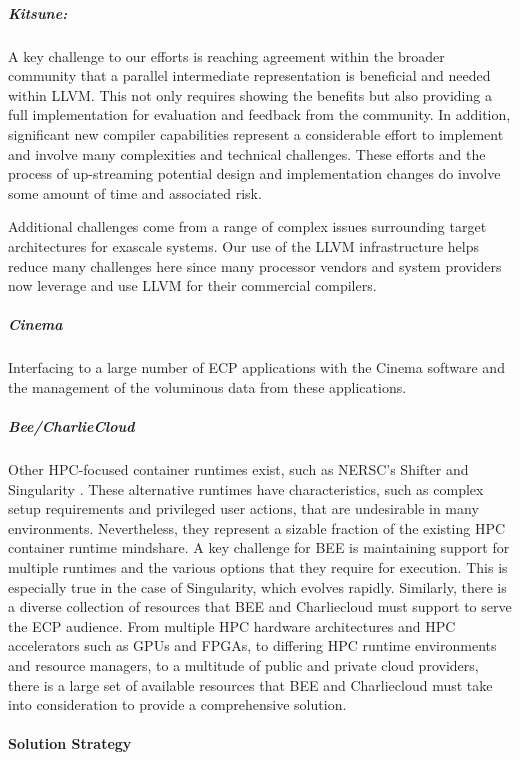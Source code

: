 \subparagraph{Kitsune:}
A key challenge to our efforts is reaching agreement within the
broader community that a parallel intermediate representation is
beneficial and needed within LLVM.  This not only requires showing the
benefits but also providing a full implementation for evaluation and
feedback from the community.  In addition, significant new compiler
capabilities represent a considerable effort to implement and involve
many complexities and technical challenges.  These efforts and the
process of up-streaming potential design and implementation changes do
involve some amount of time and associated risk.

Additional challenges come from a range of complex issues surrounding
target architectures for exascale systems.  Our use of the LLVM
infrastructure helps reduce many challenges here since many processor
vendors and system providers now leverage and use LLVM for their
commercial compilers.

\subparagraph{Cinema}
Interfacing to a large number of ECP applications with the Cinema
software and the management of the voluminous data from these
applications. 

\subparagraph{Bee/CharlieCloud}
Other HPC-focused container runtimes exist, such as NERSC's Shifter
\cite{canonrsjacobsend} and
Singularity \cite{kurtzergmsochatvbauermw}.  These alternative runtimes have characteristics, such as
complex setup requirements and privileged user actions, that are undesirable in
many environments.  Nevertheless, they represent a sizable fraction of the
existing HPC container runtime mindshare.  A key challenge for BEE is
maintaining support for multiple runtimes and the various options that they require
for execution.  This is especially true in the case of Singularity, which
evolves rapidly.  Similarly, there is a diverse collection of resources that
BEE and Charliecloud must support to serve the ECP audience.  From multiple HPC
hardware architectures and HPC accelerators such as GPUs and FPGAs, to
differing HPC runtime environments and resource managers, to a multitude of
public and private cloud providers, there is a large set of available resources
that BEE and Charliecloud must take into consideration to provide a
comprehensive solution.

\paragraph{Solution Strategy} \leavevmode \\


